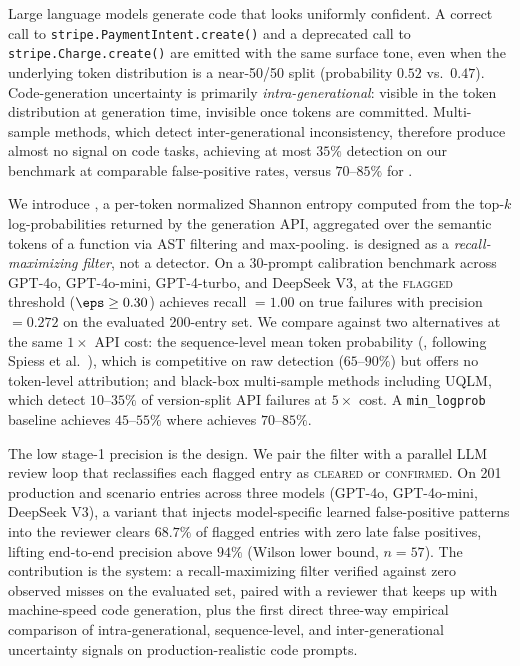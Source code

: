 Large language models generate code that looks uniformly confident. A correct
call to \texttt{stripe.PaymentIntent.create()} and a deprecated call to
\texttt{stripe.Charge.create()} are emitted with the same surface tone, even
when the underlying token distribution is a near-50/50 split (probability
$0.52$ vs.\ $0.47$). Code-generation uncertainty is primarily \emph{intra-generational}: visible
in the token distribution at generation time, invisible once tokens are
committed. Multi-sample methods, which detect inter-generational
inconsistency, therefore produce almost no signal on code tasks, achieving at
most $35\%$ detection on our benchmark at comparable false-positive rates,
versus $70$--$85\%$ for \eps.

We introduce \eps, a per-token normalized Shannon entropy computed from the
top-$k$ log-probabilities returned by the generation API, aggregated over the
semantic tokens of a function via AST filtering and max-pooling. \eps is
designed as a \emph{recall-maximizing filter}, not a detector. On a
30-prompt calibration benchmark across GPT-4o, GPT-4o-mini, GPT-4-turbo, and
DeepSeek V3, \eps at the \textsc{flagged} threshold ($\eps \ge 0.30$)
achieves recall $=1.00$ on true failures with precision $=0.272$ on the
evaluated 200-entry set. We compare against two alternatives at the same
$1\times$ API cost: the sequence-level mean token probability (\papg,
following Spiess et al.~\cite{spiess2025calibration}), which is competitive
on raw detection ($65$--$90\%$) but offers no token-level attribution; and
black-box multi-sample methods including UQLM, which detect $10$--$35\%$ of
version-split API failures at $5\times$ cost. A \texttt{min\_logprob}
baseline achieves $45$--$55\%$ where \eps achieves $70$--$85\%$.

The low stage-1 precision is the design. We pair the filter with a parallel
LLM review loop that reclassifies each flagged entry as \textsc{cleared} or
\textsc{confirmed}. On 201 production and scenario entries across three
models (GPT-4o, GPT-4o-mini, DeepSeek V3), a variant that injects model-specific learned false-positive
patterns into the reviewer clears $68.7\%$ of flagged entries with zero
late false positives, lifting end-to-end precision above $94\%$ (Wilson
lower bound, $n=57$). The contribution is the system: a recall-maximizing
filter verified against zero observed misses on the evaluated set, paired
with a reviewer that keeps up with machine-speed code generation, plus the
first direct three-way empirical comparison of intra-generational,
sequence-level, and inter-generational uncertainty signals on
production-realistic code prompts.
